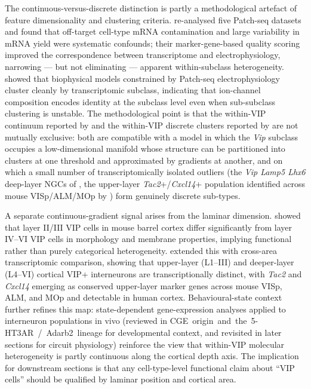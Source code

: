 \documentclass[11pt]{article}
\begin{document}
The continuous-versus-discrete distinction is partly a methodological artefact of feature dimensionality and clustering criteria. \citet{Tripathy2018} re-analysed five Patch-seq datasets and found that off-target cell-type mRNA contamination and large variability in mRNA yield were systematic confounds; their marker-gene-based quality scoring improved the correspondence between transcriptome and electrophysiology, narrowing --- but not eliminating --- apparent within-subclass heterogeneity. \citet{Nandi2022} showed that biophysical models constrained by Patch-seq electrophysiology cluster cleanly by transcriptomic subclass, indicating that ion-channel composition encodes identity at the subclass level even when sub-subclass clustering is unstable. The methodological point is that the within-VIP continuum reported by \citet{Scala2021} and the within-VIP discrete clusters reported by \citet{Gouwens2020a} are not mutually exclusive: both are compatible with a model in which the \textit{Vip} subclass occupies a low-dimensional manifold whose structure can be partitioned into clusters at one threshold and approximated by gradients at another, and on which a small number of transcriptomically isolated outliers (the \textit{Vip Lamp5 Lhx6} deep-layer NGCs of \citet{Scala2021}, the upper-layer \textit{Tac2}+/\textit{Cxcl14}+ population identified across mouse VISp/ALM/MOp by \citet{Wu2022}) form genuinely discrete sub-types.

A separate continuous-gradient signal arises from the laminar dimension. \citet{Pronneke2015} showed that layer II/III VIP cells in mouse barrel cortex differ significantly from layer IV--VI VIP cells in morphology and membrane properties, implying functional rather than purely categorical heterogeneity. \citet{Wu2022} extended this with cross-area transcriptomic comparison, showing that upper-layer (L1--III) and deeper-layer (L4--VI) cortical VIP+ interneurons are transcriptionally distinct, with \textit{Tac2} and \textit{Cxcl14} emerging as conserved upper-layer marker genes across mouse VISp, ALM, and MOp and detectable in human cortex. Behavioural-state context further refines this map: state-dependent gene-expression analyses applied to interneuron populations in vivo (reviewed in CGE~origin~and~the~5-HT3AR~/~Adarb2~lineage for developmental context, and revisited in later sections for circuit physiology) reinforce the view that within-VIP molecular heterogeneity is partly continuous along the cortical depth axis. The implication for downstream sections is that any cell-type-level functional claim about ``VIP cells'' should be qualified by laminar position and cortical area.
\end{document}
